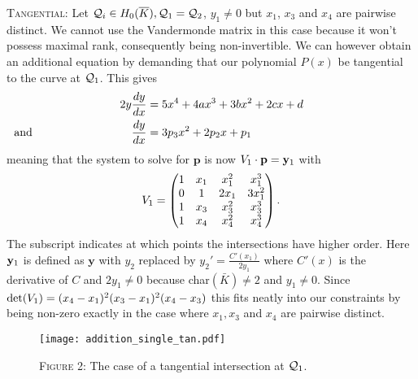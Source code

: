 \documentclass[english,11pt,a4paper]{article}
\begin{document}
\setcounter{case}{1}
\begin{case}
  {\scshape Tangential:} Let $\mathcal{Q}_i\in H_0(\overline K), \mathcal{Q}_1 = \mathcal{Q}_2$, $y_1 \neq 0$ but $x_1$, $x_3$ and $x_4$ are pairwise distinct. We cannot use the Vandermonde matrix in this case because it won't possess maximal rank, consequently being non-invertible. We can however obtain an additional equation by demanding that our polynomial $P(x)$ be tangential to the curve at $\mathcal{Q}_1$. This gives
  \begin{align*}
    2 y \frac{dy}{dx} &= 5  x^4 + 4 a x^3 + 3 b x^2 + 2 c x + d \\
    \rlap{\hspace{-37.5mm} and} \frac{dy}{dx} &= 3 p_3 x^2 + 2 p_2 x + p_1
  \end{align*}
  meaning that the system to solve for $\mathbf{p}$ is now $V_1 \cdot \mathbf{p} = \mathbf{y}_1$ with
  \begin{align*}V_1=
    \begin{pmatrix}
      1 & x_1 & x_1^2 & x_1^3\\
      0 & 1 & 2 x_1 & 3 x_1^2\\
      1 & x_3 & x_3^2 & x_3^3\\
      1 & x_4 & x_4^2 & x_4^3\\
    \end{pmatrix}.
  \end{align*}
  The subscript indicates at which points the intersections have higher order.
  Here $\mathbf{y}_1$ is defined as $\mathbf{y}$ with $y_2$ replaced by $y_2'=\frac{C'(x_1)}{2 y_1}$ where $C'(x)$ is the derivative of $C$ and $2y_1 \neq 0$ because char$(\bar K) \neq 2$ and $y_1\neq 0$. Since $\det(V_1) = (x_4-x_1)^2(x_3-x_1)^2(x_4-x_3)$ this fits neatly into our constraints by being non-zero exactly in the case where $x_1, x_3$ and $x_4$ are pairwise distinct.

\begin{figure}[ht]
  \fline
  \begin{center}
    \vspace{1mm}
    \texttt{[image: addition\_single\_tan.pdf]}

    {\scshape Figure 2}: The case of a tangential intersection at $\mathcal{Q}_1$.
  \end{center}
  \vspace{-1.5mm}
  \fline
\end{figure}


\end{case}
\end{document}
